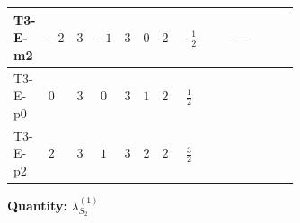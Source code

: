 \documentclass[8pt]{article}
\begin{document}
\begin{landscape}
\begin{longtable}{@{}llcccccc >{\raggedright\arraybackslash}p{0.21\linewidth} >{\raggedright\arraybackslash}p{0.21\linewidth} >{\raggedright\arraybackslash}p{0.21\linewidth}@{}}
\midrule
T3-E-m2 & $-2$ & $3$ & $-1$ & $3$ & $0$ & $2$ & $-\frac{1}{2}$ & \scriptsize\adjustbox{max width=\linewidth}{$\begin{gathered} +21 {g_2}^4\end{gathered}$} & --- & \scriptsize\adjustbox{max width=\linewidth}{$\begin{gathered} +{g_2}^2 (-24 {\lambda_{S_2}^{(1)}}-12 {\lambda_{S_2}^{(A)}})\end{gathered}$} \\
\midrule
T3-E-p0 & $0$ & $3$ & $0$ & $3$ & $1$ & $2$ & $\frac{1}{2}$ & \scriptsize\adjustbox{max width=\linewidth}{$\begin{gathered} +21 {g_2}^4\end{gathered}$} & \scriptsize\adjustbox{max width=\linewidth}{$\begin{gathered} +{g_1}^2 \left(12 {g_2}^2-12 {\lambda_{S_2}^{(1)}}-6 {\lambda_{S_2}^{(A)}}\right)\end{gathered}$} & \scriptsize\adjustbox{max width=\linewidth}{$\begin{gathered} +{g_2}^2 (-24 {\lambda_{S_2}^{(1)}}-12 {\lambda_{S_2}^{(A)}})\end{gathered}$} \\
\midrule
T3-E-p2 & $2$ & $3$ & $1$ & $3$ & $2$ & $2$ & $\frac{3}{2}$ & \scriptsize\adjustbox{max width=\linewidth}{$\begin{gathered} +21 {g_2}^4\end{gathered}$} & \scriptsize\adjustbox{max width=\linewidth}{$\begin{gathered} +{g_1}^2 \left(48 {g_2}^2-48 {\lambda_{S_2}^{(1)}}-24 {\lambda_{S_2}^{(A)}}\right)\end{gathered}$} & \scriptsize\adjustbox{max width=\linewidth}{$\begin{gathered} +{g_2}^2 (-24 {\lambda_{S_2}^{(1)}}-12 {\lambda_{S_2}^{(A)}})\end{gathered}$} \\
\midrule
\bottomrule
\end{longtable}
\clearpage
\noindent\textbf{Quantity: }$\lambda_{S_2}^{(1)}$\par\smallskip

\end{landscape}
\end{document}
